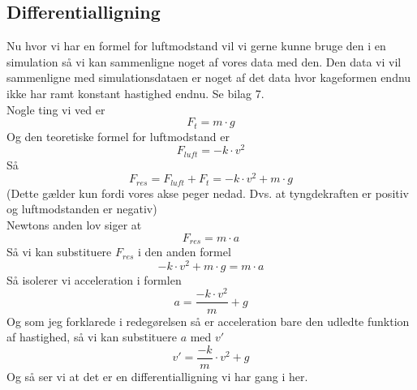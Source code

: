 \documentclass[12pt]{article}
\begin{document}
\subsection{Differentialligning}
Nu hvor vi har en formel for luftmodstand vil vi gerne kunne bruge den i en simulation så vi kan sammenligne noget af vores data med den. Den data
vi vil sammenligne med simulationsdataen er noget af det data hvor kageformen endnu ikke har ramt konstant hastighed endnu. Se bilag 7.\\
Nogle ting vi ved er
$$F_{t}=m \cdot g$$
Og den teoretiske formel for luftmodstand er
$$F_{luft}=-k \cdot v^2$$
Så
$$F_{res}=F_{luft}+F_{t}=-k \cdot v^2 + m \cdot g$$
(Dette gælder kun fordi vores akse peger nedad. Dvs. at tyngdekraften er positiv og luftmodstanden er negativ)\\
Newtons anden lov siger at
$$F_{res}=m \cdot a$$
Så vi kan substituere $F_{res}$ i den anden formel
$$-k \cdot v^2 + m \cdot g = m \cdot a$$
Så isolerer vi acceleration i formlen
$$a = \frac{-k \cdot v^2}{m} + g$$
Og som jeg forklarede i redegørelsen så er acceleration bare den udledte funktion af hastighed, så vi kan substituere
$a$ med $v'$
$$v'=\frac{-k}{m}\cdot v^2 + g$$
Og så ser vi at det er en differentialligning vi har gang i her.
\end{document}

